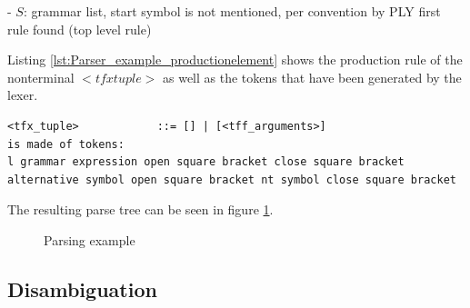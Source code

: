 - $S$: grammar list, start symbol is not mentioned, per convention by \ac{PLY} first rule found (top level rule)

Listing \ref{lst:Parser_example_productionelement} shows the production rule of the nonterminal $<tfx tuple>$ as well as the tokens that have been generated by the lexer.

\begin{lstlisting}[basicstyle=\scriptsize	,caption= Production element,label= lst:Parser_example_productionelement]
<tfx_tuple>            ::= [] | [<tff_arguments>]
is made of tokens:
l grammar expression open square bracket close square bracket alternative symbol open square bracket nt symbol close square bracket
\end{lstlisting}

The resulting parse tree can be seen in figure \ref{fig:ImplementationParsing}. 

\begin{figure}[H]
\caption{Parsing example}
\label{fig:ImplementationParsing}
\end{figure}
                
\subsection{Disambiguation}\label{sec:ImplementationParserDisambiguation}

